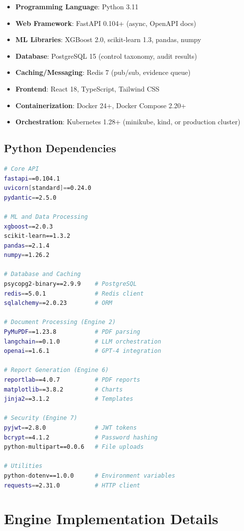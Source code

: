 \documentclass[11pt,conference]{IEEEtran}
\begin{document}
\begin{itemize}
    \item \textbf{Programming Language}: Python 3.11
    \item \textbf{Web Framework}: FastAPI 0.104+ (async, OpenAPI docs)
    \item \textbf{ML Libraries}: XGBoost 2.0, scikit-learn 1.3, pandas, numpy
    \item \textbf{Database}: PostgreSQL 15 (control taxonomy, audit results)
    \item \textbf{Caching/Messaging}: Redis 7 (pub/sub, evidence queue)
    \item \textbf{Frontend}: React 18, TypeScript, Tailwind CSS
    \item \textbf{Containerization}: Docker 24+, Docker Compose 2.20+
    \item \textbf{Orchestration}: Kubernetes 1.28+ (minikube, kind, or production cluster)
\end{itemize}

\subsection{Python Dependencies}

\begin{lstlisting}[language=bash]
# Core API
fastapi==0.104.1
uvicorn[standard]==0.24.0
pydantic==2.5.0

# ML and Data Processing
xgboost==2.0.3
scikit-learn==1.3.2
pandas==2.1.4
numpy==1.26.2

# Database and Caching
psycopg2-binary==2.9.9    # PostgreSQL
redis==5.0.1              # Redis client
sqlalchemy==2.0.23        # ORM

# Document Processing (Engine 2)
PyMuPDF==1.23.8           # PDF parsing
langchain==0.1.0          # LLM orchestration
openai==1.6.1             # GPT-4 integration

# Report Generation (Engine 6)
reportlab==4.0.7          # PDF reports
matplotlib==3.8.2         # Charts
jinja2==3.1.2             # Templates

# Security (Engine 7)
pyjwt==2.8.0              # JWT tokens
bcrypt==4.1.2             # Password hashing
python-multipart==0.0.6   # File uploads

# Utilities
python-dotenv==1.0.0      # Environment variables
requests==2.31.0          # HTTP client
\end{lstlisting}

\section{Engine Implementation Details}
\end{document}
